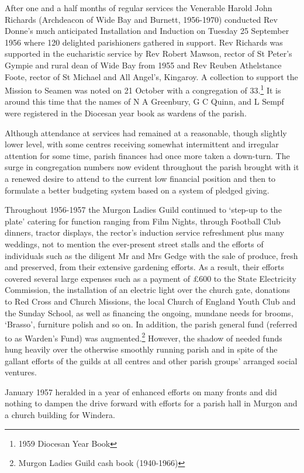 After one and a half months of regular services the Venerable Harold John Richards (Archdeacon of Wide Bay and Burnett, 1956-1970) conducted Rev Donne's much anticipated Installation and Induction on Tuesday 25 September 1956 where 120 delighted parishioners gathered in support. Rev Richards was supported in the eucharistic service by Rev Robert Mawson, rector of St Peter's Gympie and rural dean of Wide Bay from 1955 and Rev Reuben Athelstance Foote, rector of St Michael and All Angel's, Kingaroy. A collection to support the Mission to Seamen was noted on 21 October with a congregation of 33.\footnote{1959 Diocesan Year Book} It is around this time that the names of N A Greenbury, G C Quinn, and L Sempf were registered in the Diocesan year book as wardens of the parish.


Although attendance at services had remained at a reasonable, though slightly lower level, with some centres receiving somewhat intermittent and irregular attention for some time, parish finances had once more taken a down-turn. The surge in congregation numbers now evident throughout the parish brought with it a renewed desire to attend to the current low financial position and then to formulate a better budgeting system based on a system of pledged giving.



Throughout 1956-1957 the Murgon Ladies Guild continued to `step-up to the plate' catering for function ranging from Film Nights, through Football Club dinners, tractor displays, the rector's induction service refreshment plus many weddings, not to mention the ever-present street stalls and the efforts of individuals such as the diligent Mr and Mrs Gedge with the sale of produce, fresh and preserved, from their extensive gardening efforts. As a result, their efforts covered several large expenses such as a payment of \pounds600 to the State Electricity Commission, the installation of an electric light over the church gate, donations to Red Cross and Church Missions, the local Church of England Youth Club and the Sunday School, as well as financing the ongoing, mundane needs for brooms, `Brasso', furniture polish and so on. In addition, the parish general fund (referred to as Warden's Fund) was augmented.\footnote{Murgon Ladies Guild cash book (1940-1966)} However, the shadow of needed funds hung heavily over the otherwise smoothly running parish and in spite of the gallant efforts of the guilds at all centres and other parish groups' arranged social ventures.


January 1957 heralded in a year of enhanced efforts on many fronts and did nothing to dampen the drive forward with efforts for a parish hall in Murgon and a church building for Windera.



